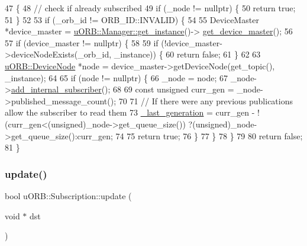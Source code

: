 \begin{DoxyCode}
47 \{
48     \textcolor{comment}{// check if already subscribed}
49     \textcolor{keywordflow}{if} (\_node != \textcolor{keyword}{nullptr}) \{
50         \textcolor{keywordflow}{return} \textcolor{keyword}{true};
51     \}
52 
53     \textcolor{keywordflow}{if} (\_orb\_id != ORB\_ID::INVALID) \{
54 
55         DeviceMaster *device\_master = \hyperlink{classuORB_1_1Manager_a9d829b3ea49d16d03c2fa37ef2bb24a5}{uORB::Manager::get\_instance}()->
      \hyperlink{classuORB_1_1Manager_a083331e24ac4f99ac11a0aab1b1681b4}{get\_device\_master}();
56 
57         \textcolor{keywordflow}{if} (device\_master != \textcolor{keyword}{nullptr}) \{
58 
59             \textcolor{keywordflow}{if} (!device\_master->deviceNodeExists(\_orb\_id, \_instance)) \{
60                 \textcolor{keywordflow}{return} \textcolor{keyword}{false};
61             \}
62 
63             \hyperlink{classuORB_1_1DeviceNode}{uORB::DeviceNode} *node = device\_master->getDeviceNode(get\_topic(), \_instance);
64 
65             \textcolor{keywordflow}{if} (node != \textcolor{keyword}{nullptr}) \{
66                 \_node = node;
67                 \_node->\hyperlink{classuORB_1_1DeviceNode_abb03278ff4ddd2a50e0f2996e856f2cc}{add\_internal\_subscriber}();
68 
69                 \textcolor{keyword}{const} \textcolor{keywordtype}{unsigned} curr\_gen = \_node->published\_message\_count();
70 
71                 \textcolor{comment}{// If there were any previous publications allow the subscriber to read them}
73 \textcolor{comment}{}                \hyperlink{classuORB_1_1Subscription_a994ab022fce2eb1c47b62444d9c5cca9}{\_last\_generation} = curr\_gen - !(curr\_gen<(unsigned)\_node->get\_queue\_size())
      ?(\textcolor{keywordtype}{unsigned})\_node->get\_queue\_size():curr\_gen;
74 
75                 \textcolor{keywordflow}{return} \textcolor{keyword}{true};
76             \}
77         \}
78     \}
79 
80     \textcolor{keywordflow}{return} \textcolor{keyword}{false};
81 \}
\end{DoxyCode}
\mbox{\label{classuORB_1_1Subscription_a2376542413f8b31c20bcbfc1a11b13ea}} 
\subsubsection{\texorpdfstring{update()}{update()}}
{\footnotesize\ttfamily bool u\+O\+R\+B\+::\+Subscription\+::update (\begin{DoxyParamCaption}\item[{void $\ast$}]{dst }\end{DoxyParamCaption})\hspace{0.3cm}{\ttfamily [inline]}}

